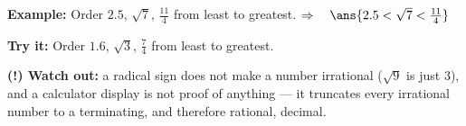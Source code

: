 \documentclass[12pt]{article}
\begin{document}
\begin{examplebox}
\textbf{Example:} Order $2.5$, $\sqrt{7}$, $\tfrac{11}{4}$ from least to
greatest.
$\Rightarrow\quad \ans{2.5 < \sqrt{7} < \tfrac{11}{4}}$
\end{examplebox}

\begin{tryitbox}
\textbf{Try it:} Order $1.6$, $\sqrt{3}$, $\tfrac{7}{4}$ from least to
greatest.\\[2pt]
\end{tryitbox}

\begin{watchoutbox}
\textbf{(!) Watch out:} a radical sign does not make a number irrational
($\sqrt{9}$ is just $3$), and a calculator display is not proof of anything ---
it truncates every irrational number to a terminating, and therefore rational,
decimal.
\end{watchoutbox}
\end{document}
